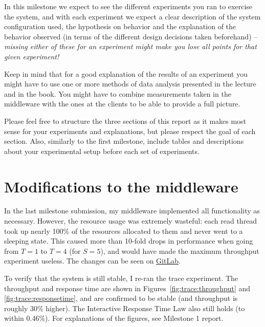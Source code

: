 \documentclass[11pt]{article}
\begin{document}
In this milestone we expect to see the different experiments you ran to exercise the system, and with each experiment we expect a clear description of the system configuration used, the hypothesis on behavior and the explanation of the behavior observed (in terms of the different design decisions taken beforehand) -- \emph{missing either of these for an experiment might make you lose all points for that given experiment!} 

Keep in mind that for a good explanation of the results of an experiment you might have to use one or more methods of data analysis presented in the lecture and in the book. You might have to combine measurements taken in the middleware with the ones at the clients to be able to provide a full picture.

Please feel free to structure the three sections of this report as it makes most sense for your experiments and explanations, but please respect the goal of each section. Also, similarly to the first milestone, include tables and descriptions about your experimental setup before each set of experiments.

\medskip

\pagebreak

\section*{Modifications to the middleware}
In the last milestone submission, my middleware implemented all functionality as necessary. However, the resource usage was extremely wasteful: each read thread took up nearly 100\% of the resources allocated to them and never went to a sleeping state. This caused more than 10-fold drops in performance when going from $T=1$ to $T=4$ (for $S=5$), and would have made the maximum throughput experiment useless. The changes can be seen on \href{https://gitlab.inf.ethz.ch/pungast/asl-fall16-project/commit/928e9bba132d34ecf9c00936babdd7fa2645e50f}{GitLab}.

To verify that the system is still stable, I re-ran the trace experiment. The throughput and response time are shown in Figures~\ref{fig:trace:throughput} and \ref{fig:trace:responsetime}, and are confirmed to be stable (and throughput is roughly 30\% higher). The Interactive Response Time Law also still holds (to within 0.46\%). For explanations of the figures, see Milestone 1 report.
\end{document}
